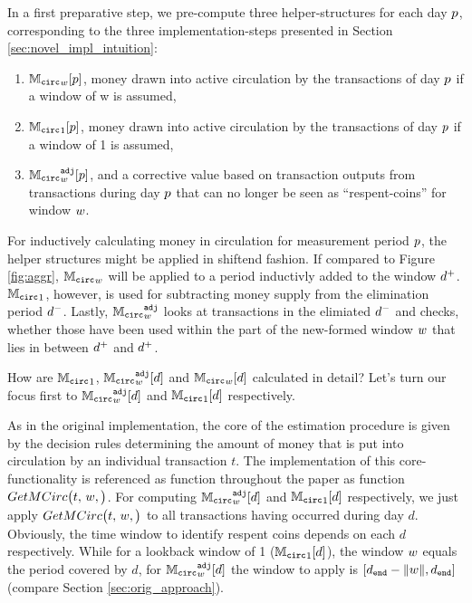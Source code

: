 In a first preparative step, we pre-compute three helper-structures for each day \({p}\), corresponding to the three implementation-steps presented in Section \ref{sec:novel_impl_intuition}:
\begin{enumerate}
\item \( {{\mathbb{M}_{\mathtt{circ}}}_{{w}}}[{p}] \), money drawn into active circulation by the transactions of day \({p}\) if a window of w is assumed,
\item \( {\mathbb{M}_{\mathtt{circ}}}_{1}[{p}] \), money drawn into active circulation by the transactions of day \( {p} \) if a window of 1 is assumed,
\item \( {{\mathbb{M}_{\mathtt{circ}}}^{\mathtt{adj}}_{{w}}}[{p}] \), and a corrective value based on transaction outputs from transactions during day \({p}\) that can no longer be seen as ``respent-coins'' for window \({w}\).  
\end{enumerate}
For inductively calculating money in circulation for measurement period \({p}\), the helper structures might be applied in shiftend fashion. %
If compared to Figure \ref{fig:aggr}, \( {{\mathbb{M}_{\mathtt{circ}}}_{{w}}} \) will be applied to a period inductivly added to the window \({d^{+}}\). %
\( {\mathbb{M}_{\mathtt{circ}}}_{1}\), however, is used for subtracting money supply from the elimination period \({d^{-}}\). %
Lastly, \( {{\mathbb{M}_{\mathtt{circ}}}^{\mathtt{adj}}_{{w}}} \) looks at transactions in the elimiated \({d^{-}}\) and checks, whether those have been used within the part of the new-formed window \({w}\) that lies in between \({d^{+}}\) and \({d^{+}}\). %


How are \({\mathbb{M}_{\mathtt{circ}}}_{1}\), \( {{\mathbb{M}_{\mathtt{circ}}}^{\mathtt{adj}}_{{w}}}[d] \) and \( {{\mathbb{M}_{\mathtt{circ}}}_{{w}}}[d] \) calculated in detail? %
Let's turn our focus first to \({{\mathbb{M}_{\mathtt{circ}}}^{\mathtt{adj}}_{{w}}}[d]\) and \({\mathbb{M}_{\mathtt{circ}}}_{1}[d]\) respectively. %

As in the original implementation, the core of the estimation procedure is given by the decision rules determining the amount of money that is put into circulation by an individual transaction \(t\). %
The implementation of this core-functionality is referenced as function throughout the paper as function \(GetMCirc\bigl(t,\,{w},\bigr)\). %
For computing \({{\mathbb{M}_{\mathtt{circ}}}^{\mathtt{adj}}_{{w}}}[d]\) and \({\mathbb{M}_{\mathtt{circ}}}_{1}[d]\) respectively, we just apply \(GetMCirc\bigl(t,\,{w},\bigr)\) to all transactions having occurred during day \(d\). %
Obviously, the time window to identify respent coins depends on each \(d\) respectively. %
While for a lookback window of 1 (\({\mathbb{M}_{\mathtt{circ}}}_{1}[d]\)), the window \({w}\) equals the period covered by \(d\), for \({{\mathbb{M}_{\mathtt{circ}}}^{\mathtt{adj}}_{{w}}}[d]\) the window to apply is \([d_{\mathtt{end}}-{\lVert w \rVert},d_{\mathtt{end}}]\) (compare Section \ref{sec:orig_approach}). %

